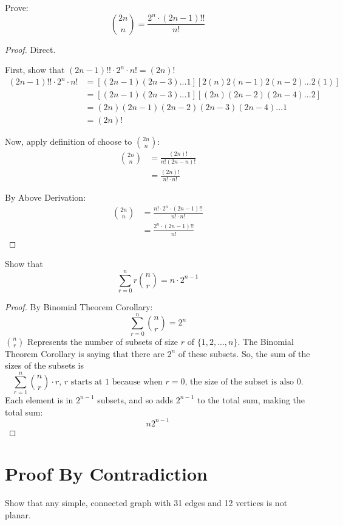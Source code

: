 \documentclass[12pt]{article}
\begin{document}
Prove:
$$\binom{2n}{n} = \frac{2^n \cdot (2n-1)!!}{n!}$$
\begin{proof}
Direct.

First, show that $(2n-1)!! \cdot 2^n \cdot n! = (2n)!$
\begin{align*}
(2n-1)!! \cdot 2^n \cdot n! &= [(2n-1)(2n-3)...1][2(n)2(n-1)2(n-2)...2(1)]\\
&= [(2n-1)(2n-3)...1][(2n)(2n-2)(2n-4)...2]\\
&= (2n)(2n-1)(2n-2)(2n-3)(2n-4)...1\\
&= (2n)!
\end{align*}

Now, apply definition of choose to $\binom{2n}{n}$:
\begin{align*}
\binom{2n}{n} &= \frac{(2n)!}{n!(2n - n)!}\\
&= \frac{(2n)!}{n! \cdot n!}
\end{align*}

By Above Derivation:
\begin{align*}
\binom{2n}{n} &= \frac{n! \cdot 2^n \cdot (2n-1)!!}{n! \cdot n!}\\
&= \frac{2^n \cdot (2n-1)!!}{n!}
\end{align*}

\end{proof}

\newpage
Show that
$$\sum_{r=0}^n r \binom{n}{r} = n\cdot 2^{n-1}$$

\begin{proof}
By Binomial Theorem Corollary:
$$\sum_{r=0}^n \binom{n}{r}= 2^n$$
$\binom{n}{r}$ Represents the number of subsets of size $r$ of $\{ 1, 2, ..., n\}$. The Binomial Theorem Corollary is saying that there are $2^n$ of these subsets. So, the sum of the sizes of the subsets is
$$\sum_{r=1}^n\binom{n}{r}\cdot r\text{, }r\text{ starts at 1 because when }r=0\text{, the size of the subset is also 0.}$$
Each element is in $2^{n-1}$ subsets, and so adds $2^{n-1}$ to the total sum, making the total sum: 
$$n2^{n-1}$$
\end{proof}

\newpage
\section{Proof By Contradiction}

Show that any simple, connected graph with 31 edges and 12 vertices is not planar.
\end{document}
